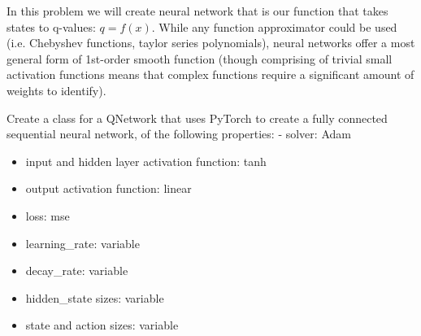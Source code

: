 \documentclass[11pt]{article}
\begin{document}
In this problem we will create neural network that is our function that
takes states to q-values: \(q=f(x)\). While any function approximator
could be used (i.e. Chebyshev functions, taylor series polynomials),
neural networks offer a most general form of 1st-order smooth function
(though comprising of trivial small activation functions means that
complex functions require a significant amount of weights to identify).

Create a class for a QNetwork that uses PyTorch to create a fully
connected sequential neural network, of the following properties: -
solver: Adam

\begin{itemize}
\item
  input and hidden layer activation function: tanh
\item
  output activation function: linear
\item
  loss: mse
\item
  learning\_rate: variable
\item
  decay\_rate: variable
\item
  hidden\_state sizes: variable
\item
  state and action sizes: variable
\end{itemize}
\end{document}
